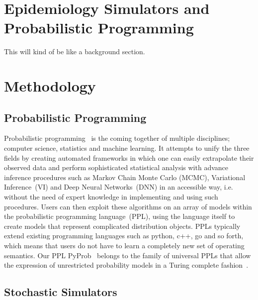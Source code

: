 \documentclass{article}
\begin{document}
\section{Epidemiology Simulators and Probabilistic Programming}
\label{sec:background}
This will kind of be like a background section. 



\section{Methodology}

\subsection{Probabilistic Programming}
Probabilistic programming~\cite{gordon2014probabilistic,staton2016semantics,kozen1979semantics} is the coming together of multiple disciplines; computer science, statistics and machine learning. 
It attempts to unify the three fields by creating automated frameworks in which one can easily extrapolate their observed data and perform sophisticated statistical analysis with advance inference procedures such as 
Markov Chain Monte Carlo (MCMC), Variational Inference~(VI) and Deep Neural Networks~(DNN) in an accessible way, i.e. without the need of expert knowledge in implementing and using such procedures.
Users can then exploit these algorithms on an array of models
within the probabilistic programming language~(PPL), using the language itself to create models that represent complicated distribution objects. 
PPLs typically extend existing programming languages such as python, c++, go and so forth, which means that users do not have to learn
a completely new set of operating semantics.  
Our PPL PyProb~\cite{le-2016-inference,baydin2018efficient} belongs to the family of universal PPLs 
that allow the expression of unrestricted probability models in a Turing complete fashion~\cite{wood2014new,goodman2012church,landau_binder_2014,siddharth2017learning,bingham2019pyro}.

\subsection{Stochastic Simulators}
\end{document}
